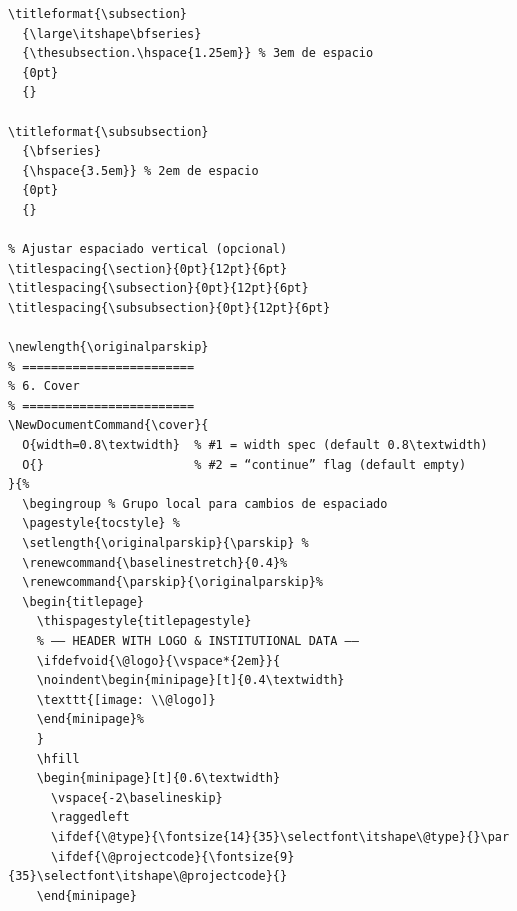 \documentclass[english]{reporti}
\begin{document}
\begin{verbatim}
\titleformat{\subsection}
  {\large\itshape\bfseries}
  {\thesubsection.\hspace{1.25em}} % 3em de espacio
  {0pt}
  {}

\titleformat{\subsubsection}
  {\bfseries}
  {\hspace{3.5em}} % 2em de espacio
  {0pt}
  {}

% Ajustar espaciado vertical (opcional)
\titlespacing{\section}{0pt}{12pt}{6pt}
\titlespacing{\subsection}{0pt}{12pt}{6pt}
\titlespacing{\subsubsection}{0pt}{12pt}{6pt}

\newlength{\originalparskip}
% ========================
% 6. Cover
% ========================
\NewDocumentCommand{\cover}{
  O{width=0.8\textwidth}  % #1 = width spec (default 0.8\textwidth)
  O{}                     % #2 = “continue” flag (default empty)
}{%
  \begingroup % Grupo local para cambios de espaciado
  \pagestyle{tocstyle} %
  \setlength{\originalparskip}{\parskip} %
  \renewcommand{\baselinestretch}{0.4}%
  \renewcommand{\parskip}{\originalparskip}%
  \begin{titlepage}
    \thispagestyle{titlepagestyle}
    % —– HEADER WITH LOGO & INSTITUTIONAL DATA —–
    \ifdefvoid{\@logo}{\vspace*{2em}}{
    \noindent\begin{minipage}[t]{0.4\textwidth}
    \texttt{[image: \\@logo]}
    \end{minipage}%
    }
    \hfill    
    \begin{minipage}[t]{0.6\textwidth}
      \vspace{-2\baselineskip}
      \raggedleft
      \ifdef{\@type}{\fontsize{14}{35}\selectfont\itshape\@type}{}\par
      \ifdef{\@projectcode}{\fontsize{9}{35}\selectfont\itshape\@projectcode}{}
    \end{minipage}
    

\end{verbatim}
\end{document}
